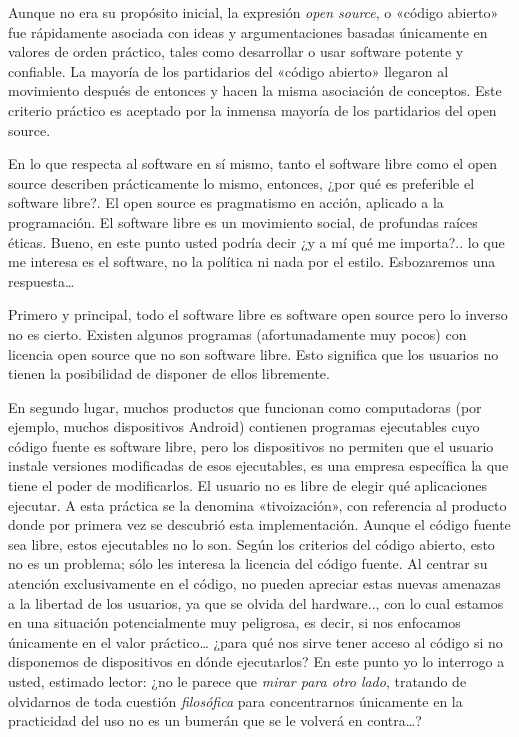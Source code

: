 \documentclass[10pt,a5paper,twoside,,]{book}
\begin{document}
Aunque no era su propósito inicial, la expresión \emph{open source}, o
«código abierto» fue rápidamente asociada con ideas y argumentaciones
basadas únicamente en valores de orden práctico, tales como desarrollar
o usar software potente y confiable. La mayoría de los partidarios del
«código abierto» llegaron al movimiento después de entonces y hacen la
misma asociación de conceptos. Este criterio práctico es aceptado por la
inmensa mayoría de los partidarios del open source.

En lo que respecta al software en sí mismo, tanto el software libre como
el open source describen prácticamente lo mismo, entonces, ¿por qué es
preferible el software libre?. El open source es pragmatismo en acción,
aplicado a la programación. El software libre es un movimiento social,
de profundas raíces éticas. Bueno, en este punto usted podría decir ¿y a
mí qué me importa?.. lo que me interesa es el software, no la política
ni nada por el estilo. Esbozaremos una respuesta\ldots{}

Primero y principal, todo el software libre es software open source pero
lo inverso no es cierto. Existen algunos programas (afortunadamente muy
pocos) con licencia open source que no son software libre. Esto
significa que los usuarios no tienen la posibilidad de disponer de ellos
libremente.

En segundo lugar, muchos productos que funcionan como computadoras (por
ejemplo, muchos dispositivos Android) contienen programas ejecutables
cuyo código fuente es software libre, pero los dispositivos no permiten
que el usuario instale versiones modificadas de esos ejecutables, es una
empresa específica la que tiene el poder de modificarlos. El usuario no
es libre de elegir qué aplicaciones ejecutar. A esta práctica se la
denomina «tivoización», con referencia al producto donde por primera vez
se descubrió esta implementación. Aunque el código fuente sea libre,
estos ejecutables no lo son. Según los criterios del código abierto,
esto no es un problema; sólo les interesa la licencia del código fuente.
Al centrar su atención exclusivamente en el código, no pueden apreciar
estas nuevas amenazas a la libertad de los usuarios, ya que se olvida
del hardware.., con lo cual estamos en una situación potencialmente muy
peligrosa, es decir, si nos enfocamos únicamente en el valor
práctico\ldots{} ¿para qué nos sirve tener acceso al código si no
disponemos de dispositivos en dónde ejecutarlos? En este punto yo lo
interrogo a usted, estimado lector: ¿no le parece que \emph{mirar para
otro lado}, tratando de olvidarnos de toda cuestión \emph{filosófica}
para concentrarnos únicamente en la practicidad del uso no es un bumerán
que se le volverá en contra\ldots{}?
\end{document}
